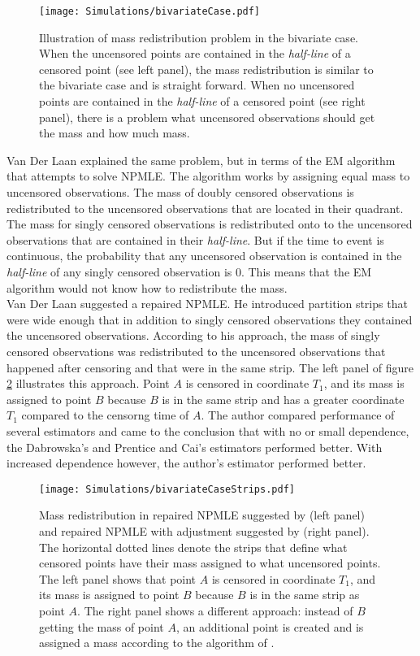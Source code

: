 \documentclass[]{article}
\begin{document}
\begin{figure}[!h]
\caption{Illustration of mass redistribution problem in the bivariate case. When the uncensored points are contained in the \emph{half-line} of a censored point (see left panel), the mass redistribution is similar to the bivariate case and is straight forward. When no uncensored points are contained in the \emph{half-line} of a censored point (see right panel), there is a problem what uncensored observations should get the mass and how much mass.}
\texttt{[image: Simulations/bivariateCase.pdf]}
\label{fig:bc}
\end{figure}

Van Der Laan explained the same problem, but in terms of the EM algorithm that attempts to solve NPMLE. The algorithm works by assigning equal mass to uncensored observations. The mass of doubly censored observations is redistributed to the uncensored observations that are located in their quadrant. The mass for singly censored observations is redistributed onto to the uncensored observations that are contained in their \emph{half-line}. But if the time to event is continuous, the probability that any uncensored observation is contained in the \emph{half-line} of any singly censored observation is $0$. This means that the EM algorithm would not know how to redistribute the mass.\\

Van Der Laan suggested a repaired NPMLE. He introduced partition strips that were wide enough that in addition to singly censored observations they contained the uncensored observations. According to his approach, the mass of singly censored observations was redistributed to the uncensored observations that happened after censoring and that were in the same strip. The left panel of figure \ref{fig:bcMoodie} illustrates this approach. Point $A$ is censored in coordinate $T_1$, and its mass is assigned to point $B$ because $B$ is in the same strip and has a greater coordinate $T_1$ compared to the censorng time of $A$.  The author compared performance of several estimators and came to the conclusion that with no or small dependence, the Dabrowska's and Prentice and Cai's estimators performed better. With increased dependence however, the author's estimator performed better.\\

\begin{figure}[!h]
\caption{Mass redistribution in repaired NPMLE suggested by \cite{van1996efficient} (left panel) and repaired NPMLE with adjustment suggested by \cite{moodie2005adjustment} (right panel). The horizontal dotted lines denote the strips that define what censored points have their mass assigned to what uncensored points. The left panel shows that point $A$ is censored in coordinate $T_1$, and its mass is assigned to point $B$ because $B$ is in the same strip as point $A$. The right panel shows a different approach: instead of $B$ getting the mass of point $A$, an additional point is created and is assigned a mass according to the algorithm of \cite{moodie2005adjustment}.}
\texttt{[image: Simulations/bivariateCaseStrips.pdf]}
\label{fig:bcMoodie}
\end{figure}
\end{document}
